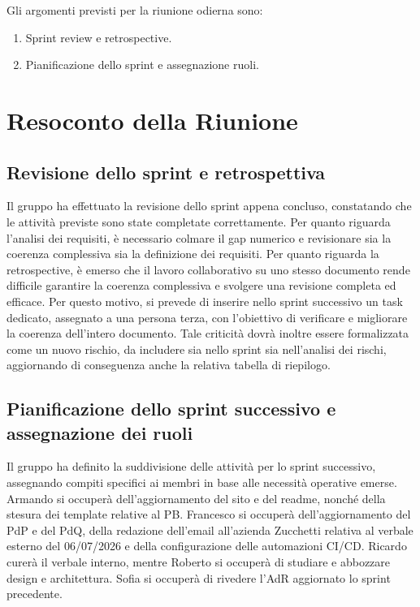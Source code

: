 Gli argomenti previsti per la riunione odierna sono:

\begin{enumerate}
    \item Sprint review e retrospective.
    \item Pianificazione dello sprint e assegnazione ruoli.
\end{enumerate}



\section{Resoconto della Riunione}

\subsection{Revisione dello sprint e retrospettiva}
Il gruppo ha effettuato la revisione dello sprint appena concluso, constatando che le attività previste sono state completate correttamente. Per quanto riguarda l’analisi dei requisiti, è necessario colmare il gap numerico e revisionare sia la coerenza complessiva sia la definizione dei requisiti.
Per quanto riguarda la retrospective, è emerso che il lavoro collaborativo su uno stesso documento rende difficile garantire la coerenza complessiva e svolgere una revisione completa ed efficace. Per questo motivo, si prevede di inserire nello sprint successivo un task dedicato, assegnato a una persona terza, con l’obiettivo di verificare e migliorare la coerenza dell’intero documento.
Tale criticità dovrà inoltre essere formalizzata come un nuovo rischio, da includere sia nello sprint sia nell’analisi dei rischi, aggiornando di conseguenza anche la relativa tabella di riepilogo.


\subsection{Pianificazione dello sprint successivo e assegnazione dei ruoli}
Il gruppo ha definito la suddivisione delle attività per lo sprint successivo, assegnando compiti specifici ai membri in base alle necessità operative emerse. Armando si occuperà dell’aggiornamento del sito e del readme, nonché della stesura dei template relative al PB. Francesco si occuperà dell’aggiornamento del PdP e del PdQ, della redazione dell’email all’azienda Zucchetti relativa al verbale esterno del 06/07/2026 e della configurazione delle automazioni CI/CD.
Ricardo curerà il verbale interno, mentre Roberto si occuperà di studiare e abbozzare design e architettura. Sofia si occuperà di rivedere l'AdR aggiornato lo sprint precedente.


